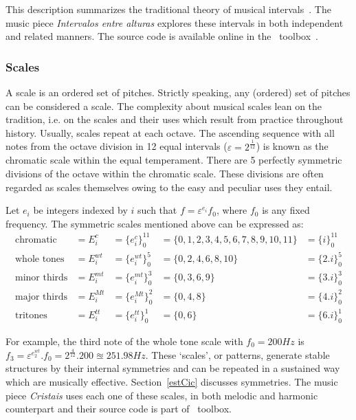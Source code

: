 This description summarizes the traditional theory of musical intervals~\cite{Lacerda}. The music piece \emph{Intervalos entre alturas} explores these intervals in both independent and related manners. The source code is available online in the \massa\ toolbox~\cite{MASSA}.

\subsubsection{Scales}\label{subsec:escalas}
A scale is an ordered set of pitches. Strictly speaking, any (ordered) set of pitches can be considered a scale. The complexity about musical scales lean on the tradition, i.e. on the scales and their uses which result from practice throughout history. Usually, scales repeat at each octave. The ascending sequence with all notes from the octave division in 12 equal intervals ($\varepsilon=2^{\frac{1}{12}}$) is known as the chromatic scale within the equal temperament. There are 5 perfectly symmetric divisions of the octave within the chromatic scale. These divisions are often regarded as scales themselves owing to the easy and peculiar uses they entail.

Let $e_i$ be integers indexed by $i$ such that
$f=\varepsilon^{e_i} f_0$,
where $f_0$ is any fixed frequency.
The symmetric scales mentioned above can be expressed as:
\begin{equation}\label{escSim}
\begin{aligned}
	\text{chromatic}    & = E_i^c    & = \{e_i^c\}_0^{11}   & =  \{0,1,2,3,4,5,6,7,8,9,10,11\} & = \{i\}_0^{11}\\
	\text{whole tones}  & = E_i^{wt} & = \{e_i^{wt}\}_0^{5} & = \{0,2,4,6,8,10\}               & = \{2.i\}_0^{5} \\
	\text{minor thirds} & = E_i^{mt} & = \{e_i^{mt}\}_0^{3} & = \{0,3,6,9\}                    & = \{3.i\}_0^3 \\
	\text{major thirds} & = E_i^{Mt} & = \{e_i^{Mt}\}_0^{2} & = \{0,4,8\}                      & = \{4.i\}_0^2\\
	\text{tritones}     & = E_i^{tt} & = \{e_i^{tt}\}_0^{1} & = \{ 0, 6 \}                     & = \{6.i\}_0^1
\end{aligned}
\end{equation}

For example, the third note of the whole tone scale with $f_0=200Hz$ is $f_3=\varepsilon^{e_2^{wt}}. f_0 = 2^{\frac{4}{12}} . 200 \approxeq 251.98
Hz$. These `scales', or patterns, generate stable structures by their internal symmetries and can be repeated in a sustained way which are musically effective. Section~\ref{estCic} discusses symmetries.
The music piece \emph{Cristais} uses each one of these scales, in both melodic and harmonic counterpart and their source code is part of \massa\ toolbox.


